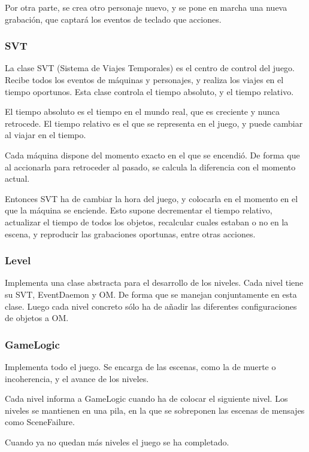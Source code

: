 \documentclass[11pt,a4paper]{article}
\begin{document}
Por otra parte, se crea otro personaje nuevo, y se pone en marcha una nueva 
grabación, que captará los eventos de teclado que acciones.

\subsubsection{SVT}

La clase SVT (Sistema de Viajes Temporales) es el centro de control del juego.  
Recibe todos los eventos de máquinas y personajes, y realiza los viajes en el 
tiempo oportunos. Esta clase controla el tiempo absoluto, y el tiempo relativo.

El tiempo absoluto es el tiempo en el mundo real, que es creciente y nunca 
retrocede. El tiempo relativo es el que se representa en el juego, y puede 
cambiar al viajar en el tiempo.

Cada máquina dispone del momento exacto en el que se encendió. De forma que al 
accionarla para retroceder al pasado, se calcula la diferencia con el momento 
actual.

Entonces SVT ha de cambiar la hora del juego, y colocarla en el momento en el 
que la máquina se enciende. Esto supone decrementar el tiempo relativo, 
actualizar el tiempo de todos los objetos, recalcular cuales estaban o no en la 
escena, y reproducir las grabaciones oportunas, entre otras acciones.

\subsubsection{Level}
Implementa una clase abstracta para el desarrollo de los niveles. Cada nivel 
tiene su SVT, EventDaemon y OM. De forma que se manejan conjuntamente en esta 
clase. Luego cada nivel concreto sólo ha de añadir las diferentes 
configuraciones de objetos a OM.

\subsubsection{GameLogic}

Implementa todo el juego. Se encarga de las escenas, como la de muerte o 
incoherencia, y el avance de los niveles.

Cada nivel informa a GameLogic cuando ha de colocar el siguiente nivel. Los 
niveles se mantienen en una pila, en la que se sobreponen las escenas de 
mensajes como SceneFailure.

Cuando ya no quedan más niveles el juego se ha completado.
\end{document}
